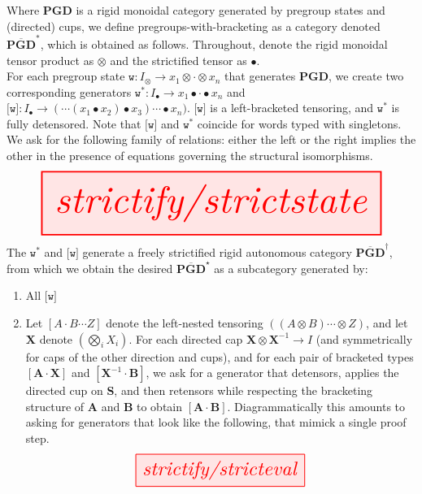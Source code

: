 \begin{construction}\label{cons:bracketing}
Where $\mathbf{PGD}$ is a rigid monoidal category generated by pregroup states and (directed) cups, we define pregroups-with-bracketing as a category denoted $\overline{\mathbf{PGD}}^*$, which is obtained as follows. Throughout, denote the rigid monoidal tensor product as $\otimes$ and the strictified tensor as $\bullet$.\\

For each pregroup state $\texttt{w} : I_\otimes \rightarrow x_1 \otimes \cdot \otimes x_n$ that generates $\mathbf{PGD}$, we create two corresponding generators $\texttt{w}^* : I_\bullet \rightarrow x_1 \bullet \cdot \bullet x_n$ and $\texttt{[w]} : I_\bullet \rightarrow (\cdots(x_1 \bullet x_2) \bullet x_3) \cdots \bullet x_n)$. $\texttt{[w]}$ is a left-bracketed tensoring, and $\texttt{w}^*$ is fully detensored. Note that $\texttt{[w]}$ and $\texttt{w}^*$ coincide for words typed with singletons. We ask for the following family of relations: either the left or the right implies the other in the presence of equations governing the structural isomorphisms.
\[\resizebox{\textwidth}{!}{\tikzfig{strictify/strictstate}}\]
The $\texttt{w}^*$ and $\texttt{[w]}$ generate a freely strictified rigid autonomous category $\overline{\mathbf{PGD}}^\dagger$, from which we obtain the desired $\overline{\mathbf{PGD}}^\star$ as a subcategory generated by:

\begin{enumerate}
\item{All $\texttt{[w]}$}
\item Let $[A \cdot B \cdots Z]$ denote the left-nested tensoring $((A \otimes B) \cdots \otimes Z)$, and let $\mathbf{X}$ denote $(\bigotimes\limits_i X_i)$. For each directed cap $\mathbf{X} \otimes \mathbf{X}^{-1} \rightarrow I$ (and symmetrically for caps of the other direction and cups), and for each pair of bracketed types $[\mathbf{A} \cdot \mathbf{X}]$ and $[\mathbf{X}^{-1} \cdot \mathbf{B}]$, we ask for a generator that detensors, applies the directed cup on \textbf{S}, and then retensors while respecting the bracketing structure of \textbf{A} and \textbf{B} to obtain $[\mathbf{A} \cdot \mathbf{B}]$. Diagrammatically this amounts to asking for generators that look like the following, that mimick a single proof step.
\[\resizebox{0.5\textwidth}{!}{\tikzfig{strictify/stricteval}}\]
\end{enumerate}
\end{construction}

